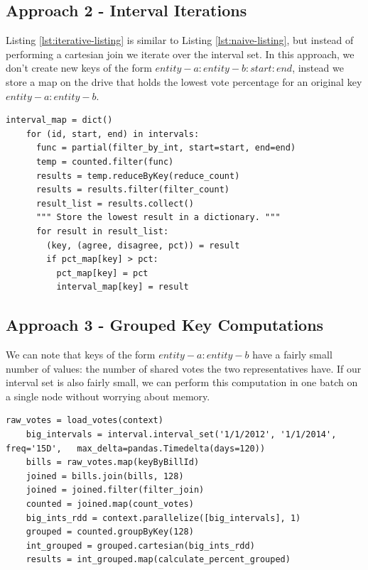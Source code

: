 \documentclass[11pt]{article}
\begin{document}
\subsection{Approach 2 - Interval Iterations}
Listing \ref{lst:iterative-listing} is similar to Listing \ref{lst:naive-listing}, but instead of performing a cartesian join we iterate over the interval set. In this approach, we don't create new keys of the form $entity-a:entity-b:start:end$, instead we store a map on the drive that holds the lowest vote percentage for an original key $entity-a:entity-b$.


\begin{lstlisting}[caption={Iterative approach}, label={lst:iterative-listing}]
    interval_map = dict()
    for (id, start, end) in intervals:
      func = partial(filter_by_int, start=start, end=end)
      temp = counted.filter(func)
      results = temp.reduceByKey(reduce_count)
      results = results.filter(filter_count)
      result_list = results.collect()
      """ Store the lowest result in a dictionary. """
      for result in result_list:
        (key, (agree, disagree, pct)) = result
        if pct_map[key] > pct:
          pct_map[key] = pct
          interval_map[key] = result
\end{lstlisting}

\subsection{Approach 3 - Grouped Key Computations}
We can note that keys of the form $entity-a:entity-b$ have a fairly small number of values: the number of shared votes the two representatives have. If our interval set is also fairly small, we can perform this computation in one batch on a single node without worrying about memory. 


\begin{lstlisting}[caption={Grouped approach}, label={lst:grouped-listing}]
    raw_votes = load_votes(context)
    big_intervals = interval.interval_set('1/1/2012', '1/1/2014', freq='15D',   max_delta=pandas.Timedelta(days=120))
    bills = raw_votes.map(keyByBillId)
    joined = bills.join(bills, 128)
    joined = joined.filter(filter_join)
    counted = joined.map(count_votes)
    big_ints_rdd = context.parallelize([big_intervals], 1)
    grouped = counted.groupByKey(128)
    int_grouped = grouped.cartesian(big_ints_rdd)
    results = int_grouped.map(calculate_percent_grouped)
\end{lstlisting}
\end{document}
